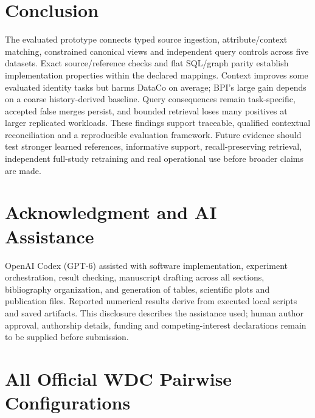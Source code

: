 \documentclass[11pt,letterpaper]{article}
\begin{document}
\section{Conclusion}
The evaluated prototype connects typed source ingestion, attribute/context matching, constrained canonical views and independent query controls across five datasets. Exact source/reference checks and flat SQL/graph parity establish implementation properties within the declared mappings. Context improves some evaluated identity tasks but harms DataCo on average; BPI's large gain depends on a coarse history-derived baseline. Query consequences remain task-specific, accepted false merges persist, and bounded retrieval loses many positives at larger replicated workloads. These findings support traceable, qualified contextual reconciliation and a reproducible evaluation framework. Future evidence should test stronger learned references, informative support, recall-preserving retrieval, independent full-study retraining and real operational use before broader claims are made.

\section*{Acknowledgment and AI Assistance}
OpenAI Codex (GPT-6) assisted with software implementation, experiment orchestration, result checking, manuscript drafting across all sections, bibliography organization, and generation of tables, scientific plots and publication files. Reported numerical results derive from executed local scripts and saved artifacts. This disclosure describes the assistance used; human author approval, authorship details, funding and competing-interest declarations remain to be supplied before submission.

\clearpage
\appendix
\section{All Official WDC Pairwise Configurations}
\begin{table}[htbp]\centering\footnotesize\setlength{\tabcolsep}{4pt}
\caption{All 27 official test configurations. Hard and Unseen are percentages. F1 is the three-seed mean. Intersections count distinct offers in training/test and validation/test; contaminated official cells are flagged by nonzero counts. Offer-disjoint subset metrics and exact denominators are provided in the supplement and generated CSV.}\label{tab:wdcall}\end{table}
\clearpage
{\small
}
\end{document}

